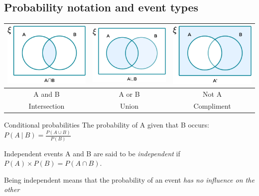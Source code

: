 \documentclass{article}
\begin{document}
\subsection{Probability notation and event types}
\begin{center}
    \begin{table}[H]
        \begin{tabular}{|c|c|c|}
        \hline
        \includegraphics[width=5cm]{IMG/AND.png} & \includegraphics[width=5cm]{IMG/OR.png} & \includegraphics[width=5cm]{IMG/NOT.png} \\
        \hline
        A and B & A or B & Not A\\
        \hline
        Intersection & Union & Compliment\\
        \hline
        \end{tabular}
    \end{table}
\end{center}
\begin{propBox}[]{Conditional probabilities}
    The probability of A given that B occurs: $P(A\ |\ B) = \frac{P(A\cup B)}{P(B)}$
\end{propBox}

\begin{propBox}[]{Independent events}
    A and B are said to be \emph{independent} if $P(A) \times P(B) = P(A\cap B)$.

    Being independent means that the probability of an event \emph{has no influence on the other}
\end{propBox}
\end{document}
